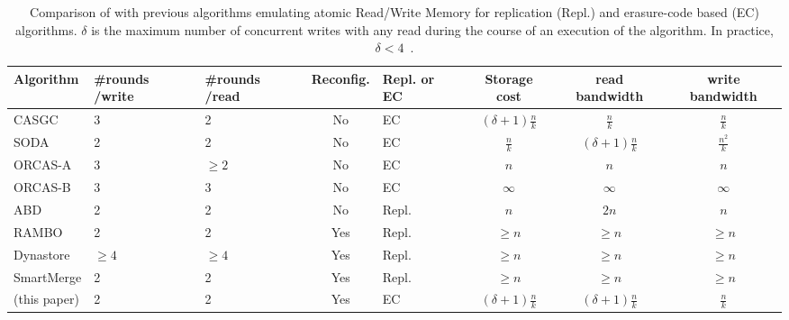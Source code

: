 		\begin{table*}[!h]
			\begin{center}
				\begin{tabular}{|lP{1cm}P{1cm}cP{1cm}ccc|}
					\hline
					\textbf{Algorithm}  & \textbf{\#rounds /write}  & \textbf{\#rounds /read} & \textbf{Reconfig.}  & \textbf{Repl. or EC} & \textbf{Storage cost}  & \textbf{read bandwidth} & \textbf{write bandwidth}  \\ 
					\hline

					{\sc CASGC} \cite{CLMM14} & 3 & 2 & No  & EC & $(\delta +1)\frac{n}{k}$  & $\frac{n}{k}$   & $\frac{n}{k}$ \\
					{\sc  SODA} \cite{SODA2016} & 2 & 2 & No & EC & $\frac{n}{k}$ & $(\delta +1)\frac{n}{k}$  & $\frac{n^2}{k}$ \\  
					{\sc ORCAS-A} \cite{DGL08} & 3 & $\geq 2$ & No  & EC & $n$ & $n$ & $n$ \\ 
					{\sc ORCAS-B} \cite{DGL08} & 3 & 3 & No  & EC & $\infty$ & $\infty$ & $\infty$ \\ 
					{\sc ABD} \cite{ABD96} & 2 & 2 & No  & Repl. & $n$ & $2n$  & $n$ \\ 
					{\sc RAMBO} \cite{LS02} & 2 & 2 & Yes  & Repl. & $\geq n$ & $\geq n$  &$\geq n$ \\
					{\sc Dynastore} \cite{AKMS09} & $\geq 4$ & $\geq 4$ & Yes & Repl. & $\geq n$ & $\geq n$ & $\geq n$ \\
					{\sc SmartMerge} \cite{LVM15} & 2 & 2  & Yes  & Repl. & $\geq n$ & $\geq n$ & $\geq n$ \\
					\hline\hline
					\ares{} (this paper) & 2 & 2 & Yes & EC & $(\delta +1)\frac{n}{k}$ & $(\delta +1)\frac{n}{k}$  & $\frac{n}{k}$ \\ \hline
				\end{tabular}
			\end{center}
			\caption{Comparison of \ares{} with previous algorithms emulating atomic Read/Write Memory for replication (Repl.) 
			and erasure-code based (EC) algorithms.  $\delta$ is the maximum number of concurrent writes with any read during the course of an execution of the algorithm. In practice, $\delta < 4$~\cite{GIZA2017}.
			}\label{tab:compare}
		\end{table*}	

